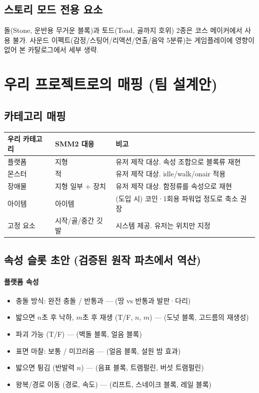 \documentclass[10pt,a4paper]{article}
\begin{document}
\subsection{스토리 모드 전용 요소}

돌(Stone, 운반용 무거운 블록)과 토드(Toad, 골까지 호위) 2종은 코스 메이커에서
사용 불가. 사운드 이펙트(감정/스팅어/리액션/연출/음악 5분류)는 게임플레이에
영향이 없어 본 카탈로그에서 세부 생략.

\section{우리 프로젝트로의 매핑 (팀 설계안)}

\subsection{카테고리 매핑}

\begin{longtable}{L{2.8cm} L{3.4cm} L{9.2cm}}
\toprule
\textbf{우리 카테고리} & \textbf{SMM2 대응} & \textbf{비고} \\
\midrule
플랫폼 & 지형 & 유저 제작 대상. 속성 조합으로 블록류 재현 \\
몬스터 & 적 & 유저 제작 대상. idle/walk/onair 적용 \\
장애물 & 지형 일부 + 장치 & 유저 제작 대상. 함정류를 속성으로 재현 \\
아이템 & 아이템 & (도입 시) 코인·1회용 파워업 정도로 축소 권장 \\
고정 요소 & 시작/골/중간 깃발 & 시스템 제공. 유저는 위치만 지정 \\
\bottomrule
\end{longtable}

\subsection{속성 슬롯 초안 (검증된 원작 파츠에서 역산)}

\paragraph{플랫폼 속성}
\begin{itemize}
  \item 충돌 방식: 완전 충돌 / 반통과 --- (땅 vs 반통과 발판·다리)
  \item 밟으면 $n$초 후 낙하, $m$초 후 재생 (T/F, $n$, $m$) --- (도넛 블록, 고드름의 재생성)
  \item 파괴 가능 (T/F) --- (벽돌 블록, 얼음 블록)
  \item 표면 마찰: 보통 / 미끄러움 --- (얼음 블록, 설원 밤 효과)
  \item 밟으면 튕김 (반발력 $n$) --- (음표 블록, 트램펄린, 버섯 트램펄린)
  \item 왕복/경로 이동 (경로, 속도) --- (리프트, 스네이크 블록, 레일 블록)
\end{itemize}
\end{document}
